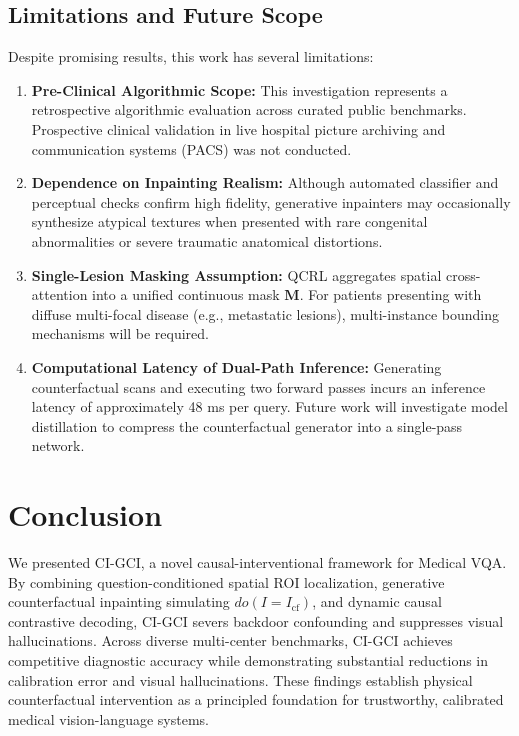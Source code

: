 \documentclass[journal,twoside,web]{ieeecolor}
\begin{document}
\subsection{Limitations and Future Scope}
Despite promising results, this work has several limitations:
\begin{enumerate}
    \item \textbf{Pre-Clinical Algorithmic Scope:} This investigation represents a retrospective algorithmic evaluation across curated public benchmarks. Prospective clinical validation in live hospital picture archiving and communication systems (PACS) was not conducted.
    \item \textbf{Dependence on Inpainting Realism:} Although automated classifier and perceptual checks confirm high fidelity, generative inpainters may occasionally synthesize atypical textures when presented with rare congenital abnormalities or severe traumatic anatomical distortions.
    \item \textbf{Single-Lesion Masking Assumption:} QCRL aggregates spatial cross-attention into a unified continuous mask $\mathbf{M}$. For patients presenting with diffuse multi-focal disease (e.g., metastatic lesions), multi-instance bounding mechanisms will be required.
    \item \textbf{Computational Latency of Dual-Path Inference:} Generating counterfactual scans and executing two forward passes incurs an inference latency of approximately 48 ms per query. Future work will investigate model distillation to compress the counterfactual generator into a single-pass network.
\end{enumerate}

\section{Conclusion}
\label{sec:conclusion}
We presented CI-GCI, a novel causal-interventional framework for Medical VQA. By combining question-conditioned spatial ROI localization, generative counterfactual inpainting simulating $do(I = I_{\text{cf}})$, and dynamic causal contrastive decoding, CI-GCI severs backdoor confounding and suppresses visual hallucinations. Across diverse multi-center benchmarks, CI-GCI achieves competitive diagnostic accuracy while demonstrating substantial reductions in calibration error and visual hallucinations. These findings establish physical counterfactual intervention as a principled foundation for trustworthy, calibrated medical vision-language systems.
\end{document}

